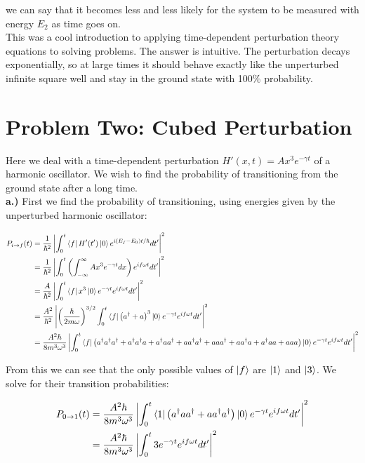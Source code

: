 \documentclass[10pt]{article} %
\begin{document}
we can say that it becomes less and less likely for the system to be measured with energy
$E_2$ as time goes on.\\

This was a cool introduction to applying time-dependent perturbation theory equations to solving
problems. The answer is intuitive. The perturbation decays exponentially, so at large times it
should behave exactly like the unperturbed infinite square well and stay in the ground state with
100\% probability.\\

\section{Problem Two: Cubed Perturbation}
Here we deal with a time-dependent perturbation $H'(x,t) = Ax^3e^{-\gamma t}$
of a harmonic oscillator. We wish to find the probability of transitioning from the ground
state after a long time.\\

\textbf{a.)} First we find the probability of transitioning, using energies given by the unperturbed
harmonic oscillator:

\begin{align*}
  P_{i\rightarrow f}(t)
  &= \frac{1}{\hbar^2}\left|\int_0^t\bra{f}H'(t')\ket{0}e^{i(E_f-E_0)t/\hbar}dt'\right|^2\\
  &= \frac{1}{\hbar^2}\left|\int_0^t
  \left(\int_{-\infty}^\infty Ax^3e^{-\gamma t}dx\right)e^{if\omega t}dt'\right|^2\\
  &= \frac{A}{\hbar^2}\left|\int_0^t\bra{f}x^3\ket{0}e^{-\gamma t}e^{if\omega t}dt'\right|^2\\
  &= \frac{A^2}{\hbar^2}\left|\left(\frac{\hbar}{2m\omega}\right)^{3/2}
  \int_0^t\bra{f}\left(a^\dagger+a\right)^3\ket{0}e^{-\gamma t}e^{if\omega t}dt'\right|^2\\
  &= \frac{A^2\hbar}{8m^3\omega^3}
  \left|\int_0^t\bra{f}
  \left(a^\dagger a^\dagger a^\dagger + a^\dagger a^\dagger a + a^\dagger aa^\dagger
  + aa^\dagger a^\dagger + aaa^\dagger + aa^\dagger a + a^\dagger aa + aaa\right)
  \ket{0}e^{-\gamma t}e^{if\omega t}dt'\right|^2\\
\end{align*}

From this we can see that the only possible values of $\ket{f}$ are $\ket{1}$ and $\ket{3}$. We
solve for their transition probabilities:

\begin{align*}
  P_{0\rightarrow 1}(t) &= \frac{A^2\hbar}{8m^3\omega^3}
  \left|\int_0^t\bra{1}\left(a^\dagger aa^\dagger + aa^\dagger a^\dagger\right)
  \ket{0}e^{-\gamma t}e^{if\omega t}dt'\right|^2\\
  &= \frac{A^2\hbar}{8m^3\omega^3}\left|\int_0^t3e^{-\gamma t}e^{if\omega t}dt'\right|^2\\
\end{align*}
\end{document}
